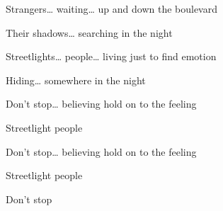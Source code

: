 \begin{song}
\bigskip

Strangers… waiting…  up and down the boulevard \par
Their shadows… searching in the night \par
{}Streetlights… people…  living just to find emotion \par
{}Hiding… somewhere in the night  \par

\bigskip

    \par
{}    \par

\bigskip

Don’t stop… believing  hold on to the feeling \par
{}Streetlight people   \par
{}Don’t stop… believing  hold on to the feeling \par
{}Streetlight people   \par
{}Don’t stop \par

\end{song}

